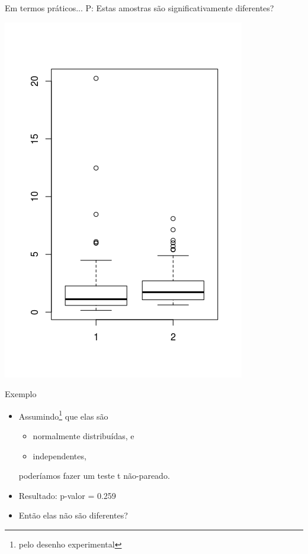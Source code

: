 \documentclass{beamer}
\begin{document}
\begin{frame}{Em termos práticos...}
P: Estas amostras são significativamente diferentes?

  \centering
  \includegraphics[height=\textheight]{Nao_Param/2samples-bp}
\end{frame}

\begin{frame}{Exemplo}
  \begin{itemize}
  \item<1-> Assumindo\footnote{pelo desenho experimental} que elas são
    \begin{itemize}
    \item<1-> normalmente distribuídas, e
    \item<1-> independentes,
    \end{itemize}
poderíamos fazer um teste t não-pareado.

  \item<2-> Resultado: p-valor = \alert{0.259}
  \item<3-> Então elas não são diferentes?
  \end{itemize}
\end{frame}
\end{document}
